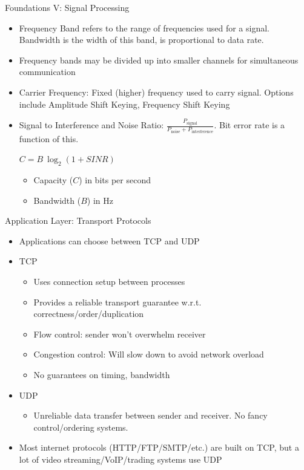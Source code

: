 \documentclass{beamer}
\begin{document}
\begin{frame}[t]{Foundations V: Signal Processing}
\begin{itemize}
    \item \alert{Frequency Band} refers to the range of frequencies used for a signal. \alert{Bandwidth} is the width of this band, is proportional to data rate.
    \item Frequency bands may be divided up into smaller \alert{channels} for simultaneous communication
    \item \pause \alert{Carrier Frequency}: Fixed (higher) frequency used to carry signal. Options include \alert{Amplitude Shift Keying}, \alert{Frequency Shift Keying}
    \item \pause \alert{Signal to Interference and Noise Ratio}: $\frac{P_{\text{signal}}}{P_{\text{noise}}+ P_{\text{interference}}}$. Bit error rate is a function of this. 
    \begin{theorem}
        $C = B\> \log_2 (1 + SINR)$
        \begin{itemize}
            \item Capacity ($C$) in bits per second
            \item Bandwidth ($B$) in Hz
        \end{itemize}
    \end{theorem}
\end{itemize}
    
\end{frame}

\begin{frame}[t]{Application Layer: Transport Protocols}
\begin{itemize}
    \item Applications can choose between TCP and UDP
    \item \pause TCP
    \begin{itemize}
        \item Uses connection setup between processes
        \item Provides a \alert{reliable transport} guarantee w.r.t. correctness/order/duplication
        \item \alert{Flow control}: sender won't overwhelm receiver
        \item \alert{Congestion control}: Will slow down to avoid network overload
        \item No guarantees on timing, bandwidth
    \end{itemize}
    \item \pause UDP
    \begin{itemize}
        \item Unreliable data transfer between sender and receiver. No fancy control/ordering systems.
    \end{itemize}
    \item \pause Most internet protocols (HTTP/FTP/SMTP/etc.) are built on TCP, but a lot of video streaming/VoIP/trading systems use UDP
\end{itemize}
\end{frame}
\end{document}
